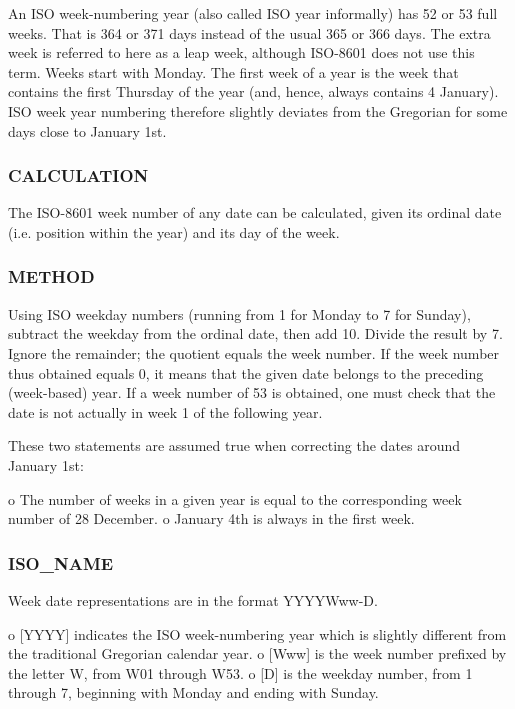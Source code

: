 An I\+SO week-\/numbering year (also called I\+SO year informally) has 52 or 53 full weeks. That is 364 or 371 days instead of the usual 365 or 366 days. The extra week is referred to here as a leap week, although I\+S\+O-\/8601 does not use this term. Weeks start with Monday. The first week of a year is the week that contains the first Thursday of the year (and, hence, always contains 4 January). I\+SO week year numbering therefore slightly deviates from the Gregorian for some days close to January 1st.

\subsubsection*{C\+A\+L\+C\+U\+L\+A\+T\+I\+ON}

The I\+S\+O-\/8601 week number of any date can be calculated, given its ordinal date (i.\+e. position within the year) and its day of the week.

\subsubsection*{M\+E\+T\+H\+OD}

Using I\+SO weekday numbers (running from 1 for Monday to 7 for Sunday), subtract the weekday from the ordinal date, then add 10. Divide the result by 7. Ignore the remainder; the quotient equals the week number. If the week number thus obtained equals 0, it means that the given date belongs to the preceding (week-\/based) year. If a week number of 53 is obtained, one must check that the date is not actually in week 1 of the following year.

These two statements are assumed true when correcting the dates around January 1st\+:

o The number of weeks in a given year is equal to the corresponding week number of 28 December. o January 4th is always in the first week.

\subsubsection*{I\+S\+O\+\_\+\+N\+A\+ME}

Week date representations are in the format Y\+Y\+Y\+Y\+Www-\/D.

o \mbox{[}Y\+Y\+YY\mbox{]} indicates the I\+SO week-\/numbering year which is slightly different from the traditional Gregorian calendar year. o \mbox{[}Www\mbox{]} is the week number prefixed by the letter W, from W01 through W53. o \mbox{[}D\mbox{]} is the weekday number, from 1 through 7, beginning with Monday and ending with Sunday.

